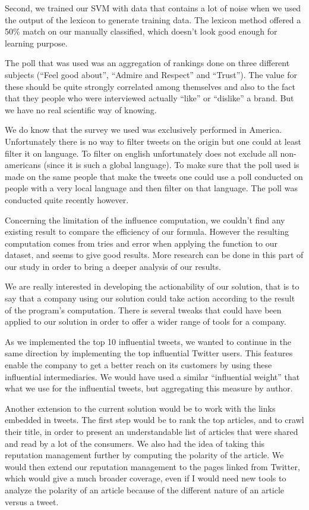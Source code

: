 \documentclass[a4paper,12pt]{report}
\begin{document}
Second, we trained our SVM with data that contains a lot of noise when we used the output of the lexicon to generate training data. The lexicon method offered a 50\% match on our manually classified, which doesn’t look good enough for learning purpose.

The poll that was used was an aggregation of rankings done on three different subjects (“Feel good about”, “Admire and Respect” and “Trust”). The value for these should be quite strongly correlated among themselves and also to the fact that they people who were interviewed actually “like” or “dislike” a brand. But we have no real scientific way of knowing.

We do know that the survey we used was exclusively performed in America. Unfortunately there is no way to filter tweets on the origin but one could at least filter it on language. To filter on english unfortunately does not exclude all non-americans (since it is such a global language). To make sure that the poll used is made on the same people that make the tweets one could use a poll conducted on people with a very local language and then filter on that language. The poll was conducted quite recently however.

Concerning the limitation of the influence computation, we couldn't find any existing result to compare the efficiency of our formula. However the resulting computation comes from tries and error when applying the function to our dataset, and seems to give good results. More research can be done in this part of our study in order to bring a deeper analysis of our results.

We are really interested in developing the actionability of our solution, that is to say that a company using our solution could take action according to the result of the program’s computation. There is several tweaks that could have been applied to our solution in order to offer a wider range of tools for a company.

As we implemented the top 10 influential tweets, we wanted to continue in the same direction by implementing the top influential Twitter users. This features enable the company to get a better reach on its customers by using these influential intermediaries. We would have used a similar “influential weight” that what we use for the influential tweets, but aggregating this measure by author.

Another extension to the current solution would be to work with the links embedded in tweets. The first step would be to rank the top articles, and to crawl their title, in order to present an understandable list of articles that were shared and read by a lot of the consumers. We also had the idea of taking this reputation management further by computing the polarity of the article. We would then extend our reputation management to the pages linked from Twitter, which would give a much broader coverage, even if I would need new tools to analyze the polarity of an article because of the different nature of an article versus a tweet.
\end{document}
